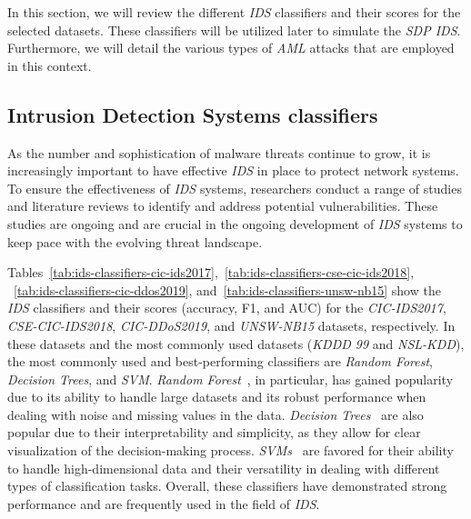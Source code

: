 In this section, we will review the different \textit{IDS} classifiers and their scores for the selected datasets.
These classifiers will be utilized later to simulate the \textit{SDP IDS}.
Furthermore, we will detail the various types of \textit{AML} attacks that are employed in this context.

\subsection{Intrusion Detection Systems classifiers}\label{subsec:intrusion-detection-systems-classifiers}

As the number and sophistication of malware threats continue to grow, it is increasingly important to have effective
\textit{IDS} in place to protect network systems.
To ensure the effectiveness of \textit{IDS} systems, researchers conduct a range of studies and literature reviews to
identify and address potential vulnerabilities.
These studies are ongoing and are crucial in the ongoing development of \textit{IDS} systems to keep pace with the
evolving threat landscape.

Tables~\ref{tab:ids-classifiers-cic-ids2017},~\ref{tab:ids-classifiers-cse-cic-ids2018},
~\ref{tab:ids-classifiers-cic-ddos2019}, and~\ref{tab:ids-classifiers-unsw-nb15} show the \textit{IDS} classifiers and
their scores (accuracy, F1, and AUC) for the \textit{CIC-IDS2017}, \textit{CSE-CIC-IDS2018}, \textit{CIC-DDoS2019}, and
\textit{UNSW-NB15} datasets, respectively.
In these datasets and the most commonly used datasets (\textit{KDDD 99} and \textit{NSL-KDD}), the most commonly used
and best-performing classifiers are \textit{Random Forest}, \textit{Decision Trees}, and \textit{SVM}.
\textit{Random Forest}~\cite{zhang2008random}, in particular, has gained popularity due to its ability to handle large
datasets and its robust performance when dealing with noise and missing values in the data.
\textit{Decision Trees}~\cite{amor2004naive} are also popular due to their interpretability and simplicity, as they
allow for clear visualization of the decision-making process.
\textit{SVMs}~\cite{mohammadi2021} are favored for their ability to handle high-dimensional data and their versatility
in dealing with different types of classification tasks.
Overall, these classifiers have demonstrated strong performance and are frequently used in the field of \textit{IDS}.

